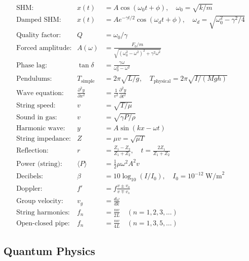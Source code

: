 \begin{align*}
&\text{SHM:} & x(t) &= A\cos(\omega_0 t + \phi), \quad \omega_0 = \sqrt{k/m} \\[4pt]
&\text{Damped SHM:} & x(t) &= Ae^{-\gamma t/2}\cos(\omega_d t + \phi), \quad \omega_d = \sqrt{\omega_0^2 - \gamma^2/4} \\[4pt]
&\text{Quality factor:} & Q &= \omega_0/\gamma \\[4pt]
&\text{Forced amplitude:} & A(\omega) &= \frac{F_0/m}{\sqrt{(\omega_0^2 - \omega^2)^2 + \gamma^2\omega^2}} \\[4pt]
&\text{Phase lag:} & \tan\delta &= \frac{\gamma\omega}{\omega_0^2 - \omega^2} \\[4pt]
&\text{Pendulums:} & T_\text{simple} &= 2\pi\sqrt{L/g}, \quad T_\text{physical} = 2\pi\sqrt{I/(Mgh)} \\[4pt]
&\text{Wave equation:} & \frac{\partial^2 y}{\partial x^2} &= \frac{1}{v^2}\frac{\partial^2 y}{\partial t^2} \\[4pt]
&\text{String speed:} & v &= \sqrt{T/\mu} \\[4pt]
&\text{Sound in gas:} & v &= \sqrt{\gamma P/\rho} \\[4pt]
&\text{Harmonic wave:} & y &= A\sin(kx - \omega t) \\[4pt]
&\text{String impedance:} & Z &= \mu v = \sqrt{\mu T} \\[4pt]
&\text{Reflection:} & r &= \frac{Z_1 - Z_2}{Z_1 + Z_2}, \quad t = \frac{2Z_1}{Z_1+Z_2} \\[4pt]
&\text{Power (string):} & \langle P\rangle &= \tfrac{1}{2}\mu\omega^2 A^2 v \\[4pt]
&\text{Decibels:} & \beta &= 10\log_{10}(I/I_0), \quad I_0 = 10^{-12}\;\text{W/m}^2 \\[4pt]
&\text{Doppler:} & f' &= f\frac{v \pm v_o}{v \mp v_s} \\[4pt]
&\text{Group velocity:} & v_g &= \frac{d\omega}{dk} \\[4pt]
&\text{String harmonics:} & f_n &= \frac{nv}{2L} \quad (n=1,2,3,\ldots) \\[4pt]
&\text{Open-closed pipe:} & f_n &= \frac{nv}{4L} \quad (n=1,3,5,\ldots)
\end{align*}

\subsection*{Quantum Physics}

